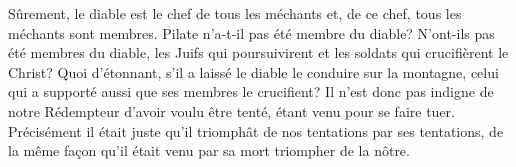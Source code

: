 Sûrement, le diable est le chef de tous les méchants
	et, de ce chef, tous les méchants sont membres.
Pilate n’a-t-il pas été membre du diable?
	N’ont-ils pas été membres du diable,
	les Juifs qui poursuivirent et les soldats qui crucifièrent le Christ?
Quoi d’étonnant, s’il a laissé le diable le conduire sur la montagne,
	celui qui a supporté aussi que ses membres le crucifient?
Il n’est donc pas indigne de notre Rédempteur d’avoir voulu être tenté,
	étant venu pour se faire tuer.
Précisément il était juste
		qu’il triomphât de nos tentations par ses tentations,
	de la même façon qu’il était venu par sa mort triompher de la nôtre.
